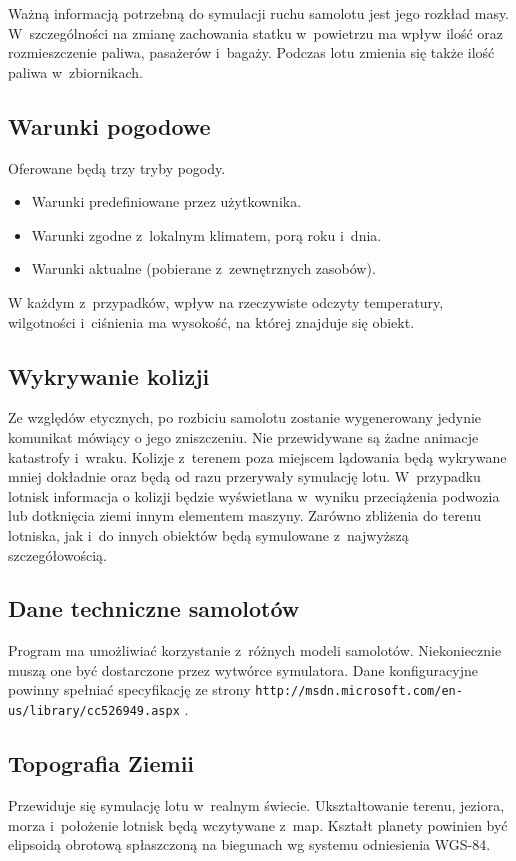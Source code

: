\documentclass{mwrep}
\begin{document}
\vspace*{\baselineskip}
Ważną informacją potrzebną do symulacji ruchu samolotu jest jego rozkład masy. W~szczególności na zmianę zachowania statku w~powietrzu ma wpływ ilość oraz rozmieszczenie paliwa, pasażerów i~bagaży. Podczas lotu zmienia się także ilość paliwa w~zbiornikach.

\subsection{Warunki pogodowe}
Oferowane będą trzy tryby pogody.
\begin{itemize}
\item Warunki predefiniowane przez użytkownika.
\item Warunki zgodne z~lokalnym klimatem, porą roku i~dnia.
\item Warunki aktualne (pobierane z~zewnętrznych zasobów).
\end{itemize}
W każdym z~przypadków, wpływ na rzeczywiste odczyty temperatury, wilgotności i~ciśnienia ma wysokość, na której znajduje się obiekt.


\subsection{Wykrywanie kolizji}
Ze względów etycznych, po rozbiciu samolotu zostanie wygenerowany jedynie komunikat mówiący o jego zniszczeniu. Nie przewidywane są żadne animacje katastrofy i~wraku. Kolizje z~terenem poza miejscem lądowania będą wykrywane mniej dokładnie oraz będą od razu przerywały symulację lotu. W~przypadku lotnisk informacja o kolizji będzie wyświetlana w~wyniku przeciążenia podwozia lub dotknięcia ziemi innym elementem maszyny. Zarówno zbliżenia do terenu lotniska, jak i~do innych obiektów będą symulowane z~najwyższą szczegółowością.

\subsection{Dane techniczne samolotów}
Program ma umożliwiać korzystanie z~różnych modeli samolotów. Niekoniecznie muszą one być dostarczone przez wytwórce symulatora. Dane konfiguracyjne powinny spełniać specyfikację ze strony \linebreak \texttt{http://msdn.microsoft.com/en-us/library/cc526949.aspx} .

\subsection{Topografia Ziemii}
Przewiduje się symulację lotu w~realnym świecie. Ukształtowanie terenu, jeziora, morza i~położenie lotnisk będą wczytywane z~map. Kształt planety powinien być elipsoidą obrotową spłaszczoną na biegunach wg systemu odniesienia WGS-84.
\end{document}
